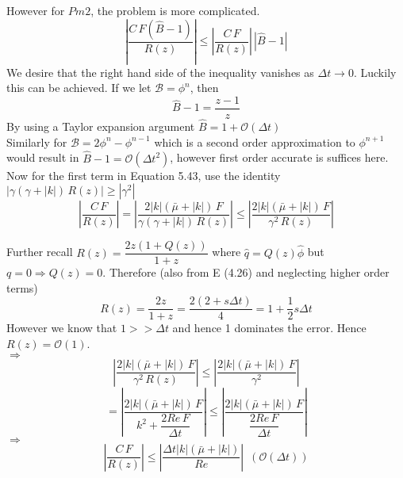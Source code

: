 However for $Pm 2$, the problem is more complicated. 
\begin{equation}
|\dfrac{C \, F(\hat{B} - 1)}{R(z)}| \leq |\dfrac{C \, F}{R(z)}| \, | \hat{B} - 1|
\end{equation}
We desire that the right hand side of the inequality vanishes as $\Delta t \rightarrow 0$. Luckily this can be achieved. If we let $\mathcal{B} = \phi^n$, then
\begin{dmath*}
\hat{B} - 1 = \dfrac{z - 1}{z}
\end{dmath*}
By using a Taylor expansion argument $\hat{B} = 1+ \mathcal{O}(\Delta t)$\\

Similarly for $\mathcal{B} = 2 \phi^n - \phi^{n-1}$ which is a second order approximation to $\phi^{n+1}$ would result in $\hat{B} - 1 = \mathcal{O} (\Delta t^2)$, however first order accurate is suffices here.\\

Now for the first term in Equation 5.43, use the identity $| \gamma (\gamma + |k|) \, R(z) | \geqslant |\gamma^2|$
\begin{dmath*}
|\dfrac{C \, F}{R(z)}| = | \dfrac{2|k| (\bar{\mu} + |k|) \, F}{\gamma(\gamma + |k|) \, R(z)} |
\leq | \dfrac{2|k| (\bar{\mu} + |k|) \, F}{\gamma^2 \, R(z)} |
\end{dmath*}

Further recall $R(z) = \dfrac{2 z(1 + Q(z))}{1 + z}$ where $\hat{q} = Q(z)\hat{\phi}$ but $q = 0 \Rightarrow Q(z) = 0$. Therefore (also from E (4.26) and neglecting higher order terms)
\begin{equation}
R(z) = \dfrac{2 z}{1 + z} = \dfrac{2 (2 + s \Delta t)}{4} = 1 + \dfrac{1}{2} s \Delta t
\end{equation}
However we know that $1 >> \Delta t$ and hence 1 dominates the error. Hence $R(z) = \mathcal{O} (1)$.\\

$\Rightarrow$
\begin{equation}
| \dfrac{2|k| (\bar{\mu} + |k|) \, F}{\gamma^2 \, R(z)} | \leq | \dfrac{2|k| (\bar{\mu} + |k|) \, F}{\gamma^2}|
\end{equation}
\begin{equation*}
= |\dfrac{2|k| (\bar{\mu} + |k|) \, F}{k^2 + \dfrac{2 Re \, F}{\Delta t}}| 
\leq |\dfrac{2|k| (\bar{\mu} + |k|) \, F}{\dfrac{2 Re \, F}{\Delta t}}| 
\end{equation*}
$\Rightarrow$
\begin{dmath*}
|\dfrac{C \, F}{R(z)}| \leq |\dfrac{\Delta t |k| (\bar{\mu} + |k|)}{Re}| \, \, \, (\mathcal{O} (\Delta t))
\end{dmath*}

